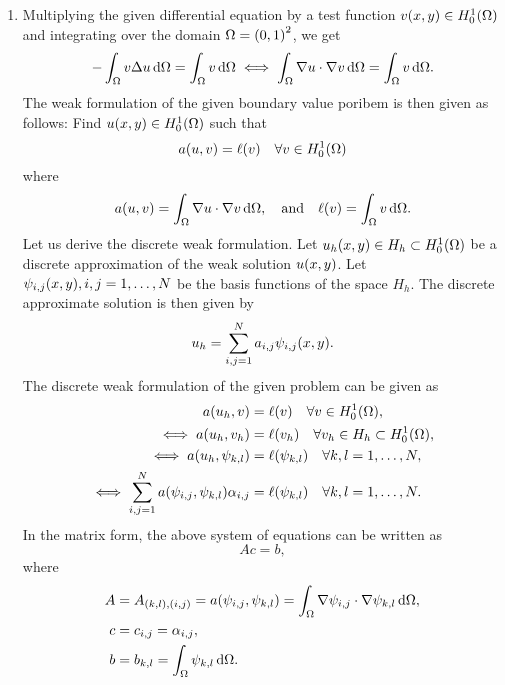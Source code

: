 \documentclass[english]{exercise}
\begin{document}
	\begin{enumerate}
		\item Multiplying the given differential equation by a test function \(v\parentheses*{x, y} \in H_0^1\parentheses*{\Omega}\) and integrating over the domain \(\Omega = \parentheses*{0, 1}^2\), we get
		\[
			-\int_\Omega v\Delta u\d\Omega = \int_\Omega v\d\Omega \iff \int_\Omega \nabla u \cdot \nabla v\d \Omega = \int_\Omega v\d\Omega.
		\]
		The weak formulation of the given boundary value poribem is then given as follows:
		Find \(u\parentheses*{x, y} \in H_0^1\parentheses*{\Omega}\) such that
		\[
			a\parentheses*{u, v} = \ell\parentheses*{v} \quad \forall v \in H_0^1\parentheses*{\Omega}
		\]
		where
		\[
			a\parentheses*{u, v} = \int_\Omega \nabla u \cdot \nabla v\d\Omega, \quad \text{and} \quad \ell\parentheses*{v} = \int_\Omega v\d\Omega.
		\]
		Let us derive the discrete weak formulation.
		Let \(u_h\parentheses*{x, y} \in H_h \subset H_0^1\parentheses*{\Omega}\) be a discrete approximation of the weak solution \(u\parentheses*{x, y}\).
		Let \(\psi_{i, j}\parentheses*{x, y}, i, j = 1, \ldots, N\) be the basis functions of the space \(H_h\).
		The discrete approximate solution is then given by
		\[
			u_h = \sum_{i, j = 1}^N a_{i, j}\psi_{i, j}\parentheses*{x, y}.
		\]
		The discrete weak formulation of the given problem can be given as
		\begin{align*}
			a\parentheses*{u_h, v} &= \ell\parentheses*{v} \quad \forall v \in H_0^1\parentheses*{\Omega},\\
			\iff a\parentheses*{u_h, v_h} &= \ell\parentheses*{v_h} \quad \forall v_h \in H_h \subset H_0^1\parentheses*{\Omega},\\
			\iff a\parentheses*{u_h, \psi_{k, l}} &= \ell\parentheses*{\psi_{k, l}} \quad \forall k, l = 1, \ldots, N,\\
			\iff \sum_{i, j = 1}^N a\parentheses*{\psi_{i, j}, \psi_{k, l}}\alpha_{i, j} &= \ell\parentheses*{\psi_{k, l}} \quad \forall k, l = 1, \ldots, N.
		\end{align*}
		In the matrix form, the above system of equations can be written as
		\[
			Ac = b,
		\]
		where
		\begin{align*}
			A &= A_{\parentheses*{k, l}, \parentheses*{i, j}} = a\parentheses*{\psi_{i, j}, \psi_{k, l}} = \int_\Omega \nabla\psi_{i, j} \cdot \nabla\psi_{k, l}\d\Omega,\\
			c &= c_{i, j} = \alpha_{i, j},\\
			b &= b_{k, l} = \int_\Omega \psi_{k, l}\d\Omega.
		\end{align*}

\end{enumerate}
\end{document}
